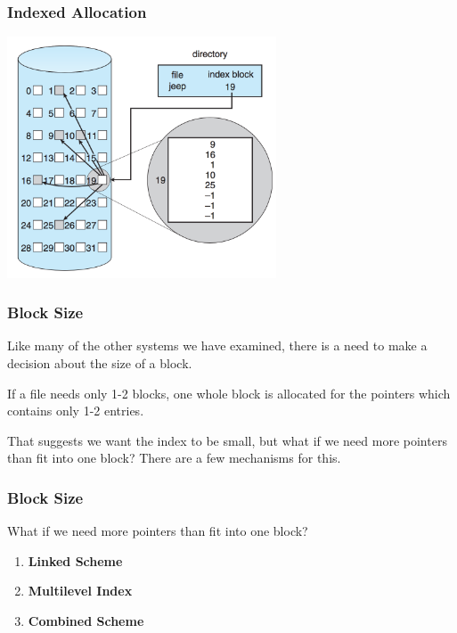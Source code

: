 \begin{frame}
\frametitle{Indexed Allocation}

\begin{center}
	\includegraphics[width=0.6\textwidth]{images/disk-indexed.png}
\end{center}


\end{frame}

\begin{frame}
\frametitle{Block Size}

Like many of the other systems we have examined, there is a need to make a decision about the size of a block. 

If a file needs only 1-2 blocks, one whole block is allocated for the pointers which contains only 1-2 entries. 

That suggests we want the index to be small, but what if we need more pointers than fit into one block? There are a few mechanisms for this.


\end{frame}

\begin{frame}
\frametitle{Block Size}

What if we need more pointers than fit into one block?

\begin{enumerate}
	\item \textbf{Linked Scheme}
	\item \textbf{Multilevel Index}
	\item \textbf{Combined Scheme}
\end{enumerate}


\end{frame}

